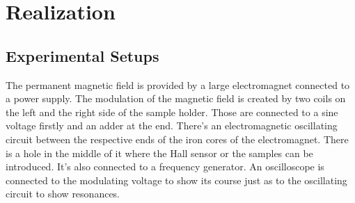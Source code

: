 \section{Realization}
\subsection{Experimental Setups}
The permanent magnetic field is provided by a large electromagnet connected to a power supply. The modulation of the magnetic field is created by two coils on the left and the right side of the sample holder. Those are connected to a sine voltage firstly and an adder at the end. There's an electromagnetic oscillating circuit between the respective ends of the iron cores of the electromagnet. There is a hole in the middle of it where the Hall sensor or the samples can be introduced. It's also connected to a frequency generator. An oscilloscope is connected to the modulating voltage to show its course just as to the oscillating circuit to show resonances.
